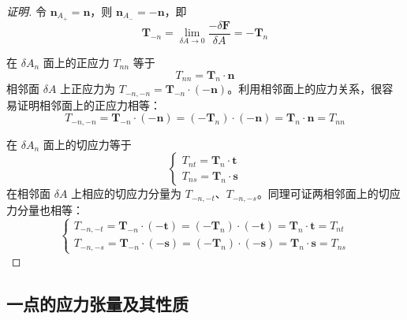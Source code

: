 \begin{proof}[证明]
	令 $\boldsymbol{n}_{A_+}=\boldsymbol{n}$，则 $\boldsymbol{n}_{A_-}=-\boldsymbol{n}$，即
	\begin{equation}\label{eq:stress-action-reaction}
		\boldsymbol{T}_{-n}=\lim_{\delta A\to 0}\frac{-\delta\boldsymbol{F}}{\delta A}=-\boldsymbol{T}_n
	\end{equation}

	在 $\delta A_n$ 面上的正应力 $T_{nn}$ 等于
	\begin{equation}\label{eq:normal-stress}
		T_{nn}=\boldsymbol{T}_n\cdot\boldsymbol{n}
	\end{equation}
	相邻面 $\delta A$ 上正应力为 $T_{-n,-n}=\boldsymbol{T}_{-n}\cdot(-\boldsymbol{n})$。利用相邻面上的应力关系，很容易证明相邻面上的正应力相等：
	\begin{equation}\label{eq:normal-stress-equal}
		T_{-n,-n}=\boldsymbol{T}_{-n}\cdot(-\boldsymbol{n})=(-\boldsymbol{T}_n)\cdot(-\boldsymbol{n})=\boldsymbol{T}_n\cdot\boldsymbol{n}=T_{nn}
	\end{equation}

	在 $\delta A_n$ 面上的切应力等于
	\begin{equation}\label{eq:shear-stress}
		\left\{\begin{array}{l}
			T_{nt}=\boldsymbol{T}_n\cdot\boldsymbol{t}\\[2pt]
			T_{ns}=\boldsymbol{T}_n\cdot\boldsymbol{s}
		\end{array}\right.
	\end{equation}
	在相邻面 $\delta A$ 上相应的切应力分量为 $T_{-n,-t}$、$T_{-n,-s}$。同理可证两相邻面上的切应力分量也相等：
	\begin{equation}\label{eq:shear-stress-equal}
		\left\{\begin{array}{l}
			T_{-n,-t}=\boldsymbol{T}_{-n}\cdot(-\boldsymbol{t})=(-\boldsymbol{T}_n)\cdot(-\boldsymbol{t})=\boldsymbol{T}_n\cdot\boldsymbol{t}=T_{nt}\\[2pt]
			T_{-n,-s}=\boldsymbol{T}_{-n}\cdot(-\boldsymbol{s})=(-\boldsymbol{T}_n)\cdot(-\boldsymbol{s})=\boldsymbol{T}_n\cdot\boldsymbol{s}=T_{ns}
		\end{array}\right.
	\end{equation}
\end{proof}

\subsection{一点的应力张量及其性质}


